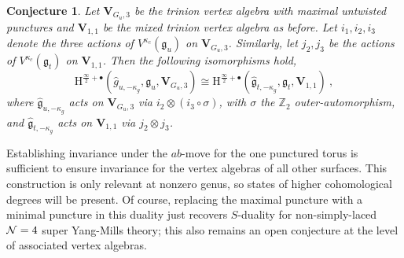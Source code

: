 \documentclass[a4paper]{article}
\newtheorem{conj}[thm]{Conjecture}
\def\IZ{\mathbb{Z}}
\def\NN{{\cal N}}
\def\gf{\mathfrak{g}}
\newcommand{\Hi}[1]{\mathrm{H}^{\frac{\infty}{2}+#1}}
\def\V{\mathbf{V}}
\begin{document}
\begin{conj}
Let $\V_{G_u,3}$ be the trinion vertex algebra with maximal untwisted punctures and $\V_{1,1}$ be the mixed trinion vertex algebra as before. Let $i_1,i_2,i_3$ denote the three actions of $V^{\kappa_c}(\gf_u)$ on $\V_{G_u,3}$. Similarly, let $j_2,j_3$ be the actions of $V^{\kappa_c}(\gf_t)$ on $\V_{1,1}$. Then the following isomorphisms hold,
\begin{equation*}
\Hi{\bullet}(\hat{g}_{u,-\kappa_g},\gf_u,\V_{G_u,3})\cong \Hi{\bullet}(\hat{\gf}_{t,-\kappa_g},\gf_t,\V_{1,1})~,
\end{equation*}
where $\hat{\gf}_{u,-\kappa_g}$ acts on $\V_{G_u,3}$ via $i_2\otimes (i_3\circ \sigma)$, with $\sigma$ the $\IZ_2$ outer-automorphism, and $\hat{\gf}_{t,-\kappa_g}$ acts on $\V_{1,1}$ via $j_2\otimes j_3$.
\end{conj}
Establishing invariance under the $ab$-move for the one punctured torus is sufficient to ensure invariance for the vertex algebras of all other surfaces. This construction is only relevant at nonzero genus, so states of higher cohomological degrees will be present. Of course, replacing the maximal puncture with a minimal puncture in this duality just recovers $S$-duality for non-simply-laced $\NN=4$ super Yang-Mills theory; this also remains an open conjecture at the level of associated vertex algebras.
\end{document}
